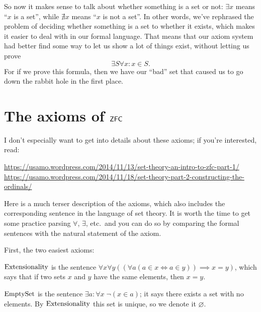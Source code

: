 So now it makes sense to talk about whether something is a set or not:
$\exists x$ means ``$x$ is a set'', while $\nexists x$ means ``$x$ is not a set''.
In other words, we've rephrased the problem of deciding whether something
is a set to whether it exists,
which makes it easier to deal with in our formal language.
That means that our axiom system had better find some way to let us
show a lot of things exist, without letting us prove
\[ \exists S \forall x : x \in S. \]
For if we prove this formula,
then we have our ``bad'' set that caused us to go down the
rabbit hole in the first place.


\section{The axioms of $\mathsf{ZFC}$}
I don't especially want to get into details about these axioms;
if you're interested, read:
\begin{itemize}
	\ii \footnotesize \url{https://usamo.wordpress.com/2014/11/13/set-theory-an-intro-to-zfc-part-1/}
	\ii \footnotesize \url{https://usamo.wordpress.com/2014/11/18/set-theory-part-2-constructing-the-ordinals/}
\end{itemize}
Here is a much terser description of the axioms,
which also includes the corresponding sentence in the language of set theory.
It is worth the time to get some practice parsing $\forall$, $\exists$, etc.\
and you can do so by comparing the formal sentences with the natural statement of the axiom.

First, the two easiest axioms:
\begin{itemize}
	\ii $\mathrm{Extensionality}$ is the sentence
	$\forall x \forall y
	\left( \left( \forall a  \left( a \in x \iff a \in y \right) \right)
	\implies x = y \right)$,
	which says that if two sets $x$ and $y$ have the same elements,
	then $x = y$.

	\ii $\mathrm{EmptySet}$ is the sentence $\exists a : \forall x \; \neg (x \in a)$;
	it says there exists a set with no elements.
	By $\mathrm{Extensionality}$ this set is unique, so we denote it $\varnothing$.
\end{itemize}

